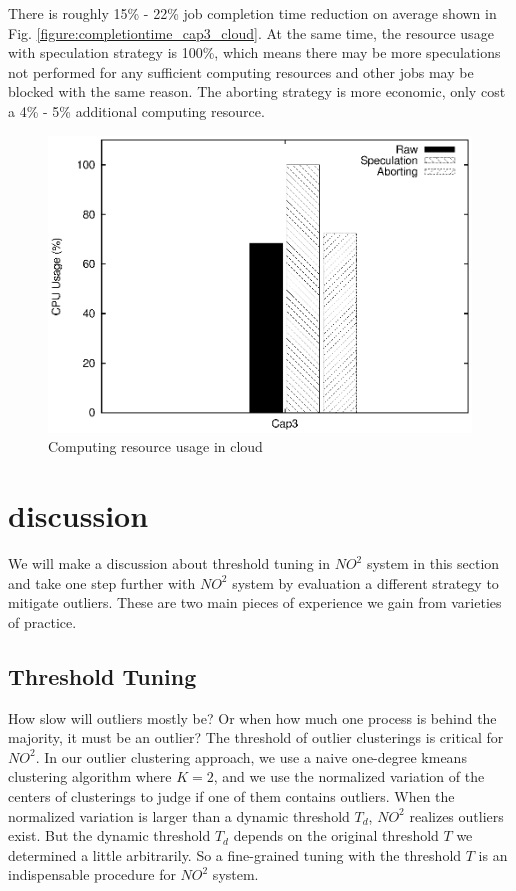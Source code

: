There is roughly 15\% - 22\% job completion time reduction on average shown in Fig. \ref{figure:completiontime_cap3_cloud}. At the same time, the resource usage with speculation strategy is 100\%, which means there may be more speculations not performed for any sufficient computing resources and other jobs may be blocked with the same reason. The aborting strategy is more economic, only cost a 4\% - 5\% additional computing resource.

\begin{figure}
\centering
\includegraphics[width=0.9\columnwidth]{figures/cloud_resource_usage.eps}
\caption{Computing resource usage in cloud}
\label{figure:resourceusage_cloud}
\end{figure}

\section{discussion}

We will make a discussion about threshold tuning in $NO^2$ system in this section and take one step further with $NO^2$ system by evaluation a different strategy to mitigate outliers. These are two main pieces of experience we gain from varieties of practice.

\subsection{Threshold Tuning}

How slow will outliers mostly be? Or when how much one process is behind the majority, it must be an outlier? The threshold of outlier clusterings is critical for $NO^2$. In our outlier clustering approach, we use a naive one-degree kmeans clustering algorithm where $K = 2$, and we use the normalized variation of the centers of clusterings to judge if one of them contains outliers. When the normalized variation is larger than a dynamic threshold $T_d$, $NO^2$ realizes outliers exist. But the dynamic threshold $T_d$ depends on the original threshold $T$ we determined a little arbitrarily. So a fine-grained tuning with the threshold $T$ is an indispensable procedure for $NO^2$ system.

